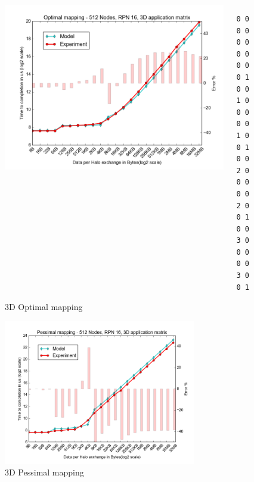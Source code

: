 \documentclass{beamer}
\begin{document}
\begin{frame}[fragile]
\begin{figure}
\caption{3D Optimal mapping}
\begin{columns}
  \begin{column}{0.6\textwidth}
    \includegraphics[width=1\textwidth]{../mappings/3d_optimal.png}
  \end{column}
  \begin{column}{0.3\textwidth}
\lstset{title=Mapping sample}
\begin{lstlisting}[basicstyle=\footnotesize\ttfamily, frame=lines,columns=fixed]
0 0 0 0 0 0
0 0 0 0 0 1
0 0 1 0 0 0
0 0 1 0 0 1
0 0 2 0 0 0
0 0 2 0 0 1
0 0 3 0 0 0
0 0 3 0 0 1
\end{lstlisting}
  \end{column}
\end{columns}
\end{figure}
\end{frame}

\begin{frame}[fragile]
\begin{figure}
\caption{3D Pessimal mapping}
\includegraphics[width=0.75\textwidth]{../mappings/3d_pessimal.png}
\end{figure}
\end{frame}
\end{document}
